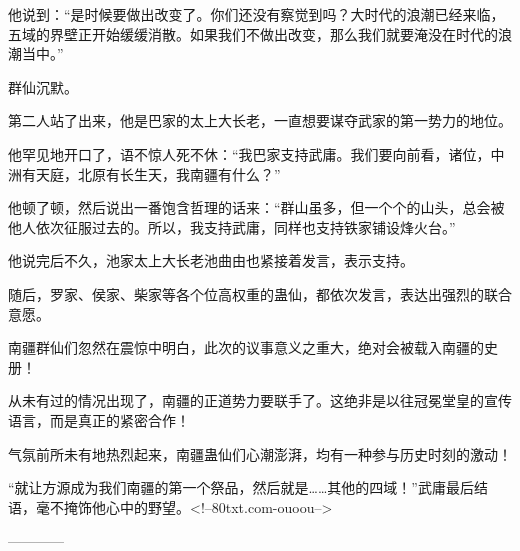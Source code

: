 \begin{this_body}
他说到：“是时候要做出改变了。你们还没有察觉到吗？大时代的浪潮已经来临，五域的界壁正开始缓缓消散。如果我们不做出改变，那么我们就要淹没在时代的浪潮当中。”

群仙沉默。

第二人站了出来，他是巴家的太上大长老，一直想要谋夺武家的第一势力的地位。

他罕见地开口了，语不惊人死不休：“我巴家支持武庸。我们要向前看，诸位，中洲有天庭，北原有长生天，我南疆有什么？”

他顿了顿，然后说出一番饱含哲理的话来：“群山虽多，但一个个的山头，总会被他人依次征服过去的。所以，我支持武庸，同样也支持铁家铺设烽火台。”

他说完后不久，池家太上大长老池曲由也紧接着发言，表示支持。

随后，罗家、侯家、柴家等各个位高权重的蛊仙，都依次发言，表达出强烈的联合意愿。

南疆群仙们忽然在震惊中明白，此次的议事意义之重大，绝对会被载入南疆的史册！

从未有过的情况出现了，南疆的正道势力要联手了。这绝非是以往冠冕堂皇的宣传语言，而是真正的紧密合作！

气氛前所未有地热烈起来，南疆蛊仙们心潮澎湃，均有一种参与历史时刻的激动！

“就让方源成为我们南疆的第一个祭品，然后就是……其他的四域！”武庸最后结语，毫不掩饰他心中的野望。<!--80txt.com-ouoou-->

------------

\end{this_body}

